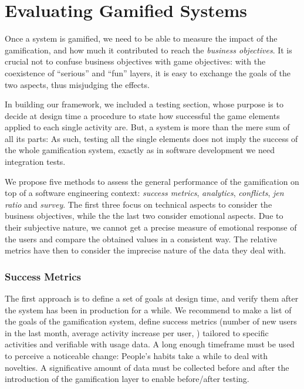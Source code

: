 \section{Evaluating Gamified Systems}\label{sec:gamification-evaluation}

Once a system is gamified, we need to be able to measure the impact of the gamification, and how much it contributed to reach the {\em business objectives}.
It is crucial not to confuse business objectives with game objectives: with the coexistence of ``serious'' and ``fun'' layers, it is easy to exchange the goals of the two aspects, thus misjudging the effects.

In building our framework, we included a testing section, whose purpose is to decide at design time a procedure to state how successful the game elements applied to each single activity are.
But, a system is more than the mere sum of all its parts: As such, testing all the single elements does not imply the success of the whole gamification system, exactly as in software development we need integration tests.

We propose five methods to assess the general performance of the gamification on top of a software engineering context: \emph{success metrics}, \emph{analytics}, \emph{conflicts}, \emph{jen ratio} and \emph{survey}.
The first three focus on technical aspects to consider the business objectives, while the the last two consider emotional aspects.
Due to their subjective nature, we cannot get a precise measure of emotional response of the users and compare the obtained values in a consistent way.
The relative metrics have then to consider the imprecise nature of the data they deal with.


\subsubsection{Success Metrics}

The first approach is to define a set of goals at design time, and verify them after the system has been in production for a while.
We recommend to make a list of the goals of the gamification system, define success metrics (number of new users in the last month, average activity increase per user, \etc) tailored to specific activities and verifiable with usage data.
A long enough timeframe must be used to perceive a noticeable change: People's habits take a while to deal with novelties.
A significative amount of data must be collected before and after the introduction of the gamification layer to enable before/after testing.


